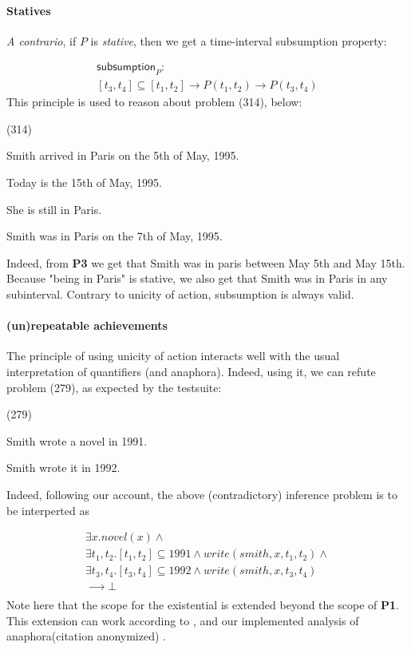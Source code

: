 \documentclass[a4paper,11pt]{article}
\newcommand\hyp{\item[H]}
\newcommand\fracasex[2]{\begin{lingex}\item[(#1)] \begin{subex} #2 \end{subex} \end{lingex} }
\newcommand\constant[1]{\mathsf{#1}}
\begin{document}
\paragraph{Statives}
\textit{A contrario}, if \(P\) is \emph{stative}, then we get a time-interval subsumption property:

\begin{multline*}
\constant {subsumption}_P :\\ [t_3,t_4] ⊆ [t_1,t_2] → P (t_1,t_2) → P (t_3,t_4)
\end{multline*}
This principle is used to reason about problem (314), below:

\fracasex{314}
{\item	Smith arrived in Paris on the 5th of May, 1995.
\item	Today is the 15th of May, 1995.
\item	She is still in Paris.
\hyp 	Smith was in Paris on the 7th of May, 1995.
}

Indeed, from \textbf{P3} we get that Smith was in paris between May
5th and May 15th. Because "being in Paris" is stative, we also get that
Smith was in Paris in any subinterval. Contrary to unicity of action,
subsumption is always valid.


\paragraph{(un)repeatable achievements}
\label{sec:repeatable-achievements}
The principle of using unicity of action interacts well with the usual
interpretation of quantifiers (and anaphora).  Indeed, using it, we
can refute problem (279), as expected by the testsuite:

\fracasex{279}{
\item	Smith wrote a novel in 1991.
\hyp 	 Smith wrote it in 1992.
}
Indeed, following our account, the above (contradictory) inference problem is to be
interperted as

\[\begin{array}{l}
∃x. novel(x) ∧ \\
∃t_1,t_2. [t_1,t_2] ⊆ 1991 ∧ write(smith,x,t_1,t_2) ∧ \\
∃t_3,t_4. [t_3,t_4] ⊆ 1992 ∧ write(smith,x,t_3,t_4) \\
⟶ ⊥ \\
\end{array}
\]
Note here that the scope for the existential is extended beyond the
scope of \textbf{P1}. This extension can work according to
\citet{unger:2011}, and our implemented analysis of anaphora\ifanon (citation anonymized) \else\citep{bernardy_computational_2018,bernardy_wide_2019}\fi.
\end{document}

